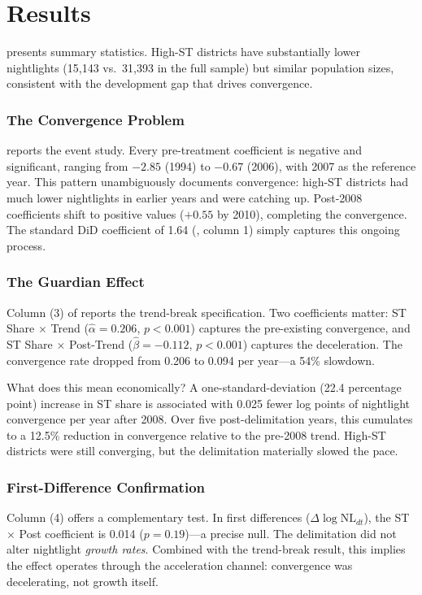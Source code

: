 \documentclass[12pt]{article}
\begin{document}
\section{Results}\label{sec:results}

 presents summary statistics. High-ST districts have substantially lower nightlights (15,143 vs.\ 31,393 in the full sample) but similar population sizes, consistent with the development gap that drives convergence.

\subsubsection*{The Convergence Problem}  reports the event study. Every pre-treatment coefficient is negative and significant, ranging from $-2.85$ (1994) to $-0.67$ (2006), with 2007 as the reference year. This pattern unambiguously documents convergence: high-ST districts had much lower nightlights in earlier years and were catching up. Post-2008 coefficients shift to positive values ($+0.55$ by 2010), completing the convergence. The standard DiD coefficient of 1.64 (, column 1) simply captures this ongoing process.

\subsubsection*{The Guardian Effect} Column (3) of  reports the trend-break specification. Two coefficients matter: ST Share $\times$ Trend ($\hat{\alpha} = 0.206$, $p < 0.001$) captures the pre-existing convergence, and ST Share $\times$ Post-Trend ($\hat{\beta} = -0.112$, $p < 0.001$) captures the deceleration. The convergence rate dropped from 0.206 to 0.094 per year---a 54\% slowdown.

What does this mean economically? A one-standard-deviation (22.4 percentage point) increase in ST share is associated with 0.025 fewer log points of nightlight convergence per year after 2008. Over five post-delimitation years, this cumulates to a 12.5\% reduction in convergence relative to the pre-2008 trend. High-ST districts were still converging, but the delimitation materially slowed the pace.

\subsubsection*{First-Difference Confirmation} Column (4) offers a complementary test. In first differences ($\Delta \log \text{NL}_{dt}$), the ST $\times$ Post coefficient is 0.014 ($p = 0.19$)---a precise null. The delimitation did not alter nightlight \textit{growth rates}. Combined with the trend-break result, this implies the effect operates through the acceleration channel: convergence was decelerating, not growth itself.
\end{document}
